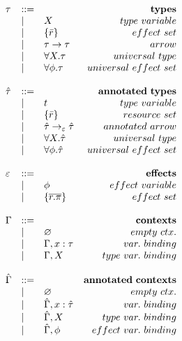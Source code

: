\documentclass{llncs}
\newcommand{\poly}[2]{
	\forall #1. #2
}
\begin{document}
\[\begin{array}{lll}
& ~~~~~~~~&

\begin{array}{lllr}

\tau & ::= & ~ & \bf{types} \\
	& | & X & type~variable \\
	& | & \{ \bar r \} & effect~set \\
	& | & \tau \rightarrow \tau & arrow \\
	& | & \forall X . \tau & universal~type \\
	& | & \forall \phi . \tau & universal~effect~set\\
	&&\\

\hat \tau & ::= & ~ & \bf{annotated ~types} \\
		& | & t & type~variable \\
		& | & \{ \bar r \} & resource~set \\
		& | & \hat \tau \rightarrow_{\varepsilon} \hat \tau & annotated~arrow\\
		& | & \poly{X}{\hat \tau} & universal~type \\
		& | & \poly{\phi}{\hat \tau} & universal~effect~set \\
		&&\\

\varepsilon & ::= & ~ &\bf{effects} \\
	& | & \phi & effect~variable \\
	& | & \{ \overline{r.\pi} \} & effect~set \\
	&&\\

\Gamma & ::= & ~ & \bf{contexts} \\
				& | & \varnothing & empty~ctx. \\
				& | & \Gamma, x: \tau & var.~binding \\
				& | & \Gamma, X & type~var.~binding \\
				&&\\
				
\hat \Gamma & ::= & ~ & \bf{annotated~contexts}\\
				& | & \varnothing & empty~ctx. \\
				& | & \hat \Gamma, x: \hat \tau & var.~binding \\
				& | & \hat \Gamma, X & type~var.~binding \\
				& | & \hat \Gamma, \phi & effect~var.~binding \\
				&&\\

\end{array}

\end{array}
\]
\end{document}
